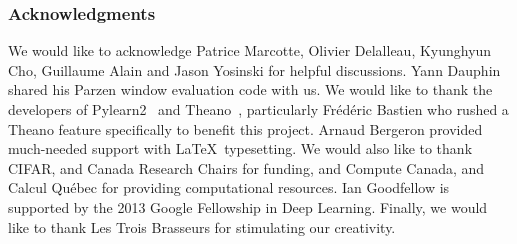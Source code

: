 \documentclass{article}
\begin{document}
\subsubsection*{Acknowledgments}
We would like to acknowledge Patrice Marcotte, Olivier Delalleau, Kyunghyun Cho, Guillaume Alain and Jason Yosinski for helpful discussions.
Yann Dauphin shared his Parzen window evaluation code with us.
We would like to thank the developers of
Pylearn2~\citep{pylearn2_arxiv_2013}
and
Theano~\citep{bergstra+al:2010-scipy,Bastien-Theano-2012}, particularly
Fr\'ed\'eric Bastien who rushed a Theano feature specifically to benefit this project.
Arnaud Bergeron provided much-needed support with \LaTeX\ typesetting.
We would also like to thank CIFAR, and Canada Research Chairs for funding, and Compute Canada, and Calcul Qu\'ebec
for providing computational resources. Ian Goodfellow is supported by the 2013 Google Fellowship in Deep
Learning. Finally, we would like to thank Les Trois Brasseurs for stimulating our creativity.

{\small

}
\end{document}
